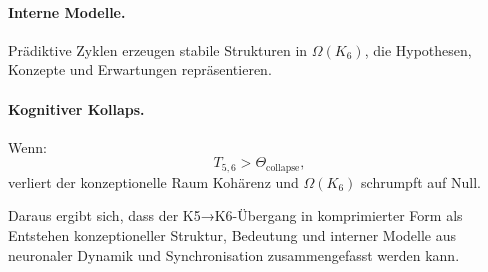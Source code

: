 \paragraph{Interne Modelle.}
Prädiktive Zyklen erzeugen stabile Strukturen in $\Omega(K_6)$, die Hypothesen,
Konzepte und Erwartungen repräsentieren.

\paragraph{Kognitiver Kollaps.}
Wenn:
\[
T_{5,6} > \Theta_{\mathrm{collapse}},
\]
verliert der konzeptionelle Raum Kohärenz und $\Omega(K_6)$ schrumpft auf Null.

Daraus ergibt sich, dass der K5→K6-Übergang in komprimierter Form als Entstehen
konzeptioneller Struktur, Bedeutung und interner Modelle aus neuronaler
Dynamik und Synchronisation zusammengefasst werden kann.
